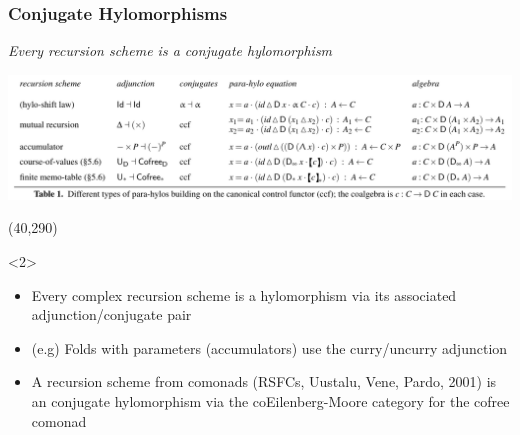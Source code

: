 \begin{frame}[fragile]
  \frametitle{Conjugate Hylomorphisms}
  \centering
  {\Large\emph{Every recursion scheme is a conjugate hylomorphism}}%

  \vspace{.4cm}

  \begin{sticky}\includegraphics[width=\textwidth]{figures/types-of-parahylos-crop.pdf}\end{sticky}

  \Put(40,290){%
    \begin{onlyenv}<2>
    \begin{minipage}{.86\columnwidth}
    \begin{greenbox}
      \small
      \begin{itemize}
        \item Every complex recursion scheme is a hylomorphism via its associated adjunction/conjugate pair
        \item (e.g) Folds with parameters (accumulators) use the curry/uncurry adjunction
        \item A recursion scheme from comonads (RSFCs, Uustalu, Vene, Pardo, 2001) is an conjugate hylomorphism via the coEilenberg-Moore category for the cofree comonad
      \end{itemize}
    \end{greenbox}
    \end{minipage}
    \end{onlyenv}
  }
\end{frame}

